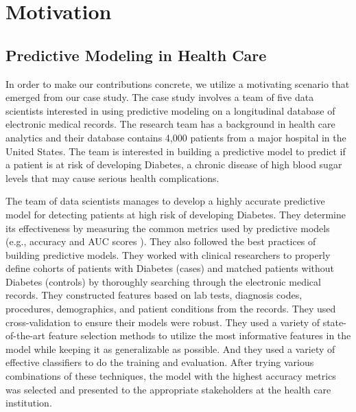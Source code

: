 
\section{Motivation}



\subsection{Predictive Modeling in Health Care}

In order to make our contributions concrete, we utilize a motivating scenario that emerged from our case study.  The case study involves a team of five data scientists interested in using predictive modeling on a longitudinal database of electronic medical records. The research team has a background in health care analytics and their database contains 4,000 patients from a major hospital in the United States. The team is interested in building a predictive model to predict if a patient is at risk of developing Diabetes, a chronic disease of high blood sugar levels that may cause serious health complications.



The team of data scientists manages to develop a highly accurate predictive model for detecting patients at high risk of developing Diabetes.  They determine its effectiveness by measuring the common metrics used by predictive models (e.g., accuracy and AUC scores \cite{kuhn2013applied}).  They also followed the best practices of building predictive models.  They worked with clinical researchers to properly define cohorts of patients with Diabetes (cases) and matched patients without Diabetes (controls) by thoroughly searching through the electronic medical records.  They constructed features based on lab tests, diagnosis codes, procedures, demographics, and patient conditions from the records.  They used cross-validation to ensure their models were robust.  They used a variety of state-of-the-art feature selection methods to utilize the most informative features in the model while keeping it as generalizable as possible.  And they used a variety of effective classifiers to do the training and evaluation.  After trying various combinations of these techniques, the model with the highest accuracy metrics was selected and presented to the appropriate stakeholders at the health care institution.

